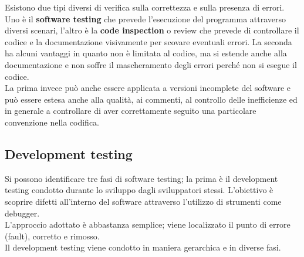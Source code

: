 Esistono due tipi diversi di verifica sulla correttezza e sulla presenza di errori.
Uno è il \textbf{software testing} che prevede l'esecuzione del programma attraverso diversi scenari, l'altro è la \textbf{code inspection} o review che prevede di controllare il codice e la documentazione visivamente per scovare eventuali errori.
La seconda ha alcuni vantaggi in quanto non è limitata al codice, ma si estende anche alla documentazione e non soffre il mascheramento degli errori perché non si esegue il codice.\\
La prima invece può anche essere applicata a versioni incomplete del software e può essere estesa anche alla qualità, ai commenti, al controllo delle inefficienze ed in generale a controllare di aver correttamente seguito una particolare convenzione nella codifica.

\subsection{Development testing}
Si possono identificare tre fasi di software testing; la prima è il development testing condotto durante lo sviluppo dagli sviluppatori stessi.
L'obiettivo è scoprire difetti all'interno del software attraverso l'utilizzo di strumenti come debugger.\\
L'approccio adottato è abbastanza semplice; viene localizzato il punto di errore (fault), corretto e rimosso.\\
Il development testing viene condotto in maniera gerarchica e in diverse fasi.

